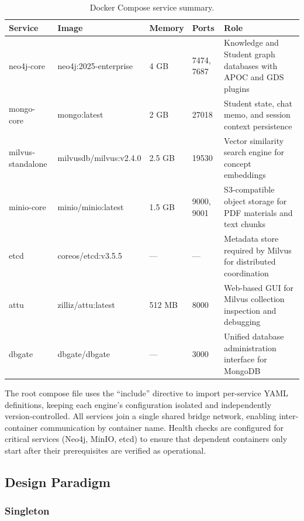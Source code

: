 \begin{table}[H]
\centering
\caption{Docker Compose service summary.}
\label{tab:docker_services}
\renewcommand{\arraystretch}{1.2}
\begin{tabularx}{\textwidth}{|l|l|l|l|X|}
\hline
Service & Image & Memory & Ports & Role \\ \hline
neo4j-core & neo4j:2025-enterprise & 4 GB & 7474, 7687 & Knowledge and Student graph databases with APOC and GDS plugins \\ \hline
mongo-core & mongo:latest & 2 GB & 27018 & Student state, chat memo, and session context persistence \\ \hline
milvus-standalone & milvusdb/milvus:v2.4.0 & 2.5 GB & 19530 & Vector similarity search engine for concept embeddings \\ \hline
minio-core & minio/minio:latest & 1.5 GB & 9000, 9001 & S3-compatible object storage for PDF materials and text chunks \\ \hline
etcd & coreos/etcd:v3.5.5 & --- & --- & Metadata store required by Milvus for distributed coordination \\ \hline
attu & zilliz/attu:latest & 512 MB & 8000 & Web-based GUI for Milvus collection inspection and debugging \\ \hline
dbgate & dbgate/dbgate & --- & 3000 & Unified database administration interface for MongoDB \\ \hline
\end{tabularx}
\end{table}

The root compose file uses the ``include'' directive to import per-service YAML definitions, keeping each engine's configuration isolated and independently version-controlled. All services join a single shared bridge network, enabling inter-container communication by container name. Health checks are configured for critical services (Neo4j, MinIO, etcd) to ensure that dependent containers only start after their prerequisites are verified as operational.

\subsection{Design Paradigm}


\subsubsection{Singleton}\label{sub:singleton}


